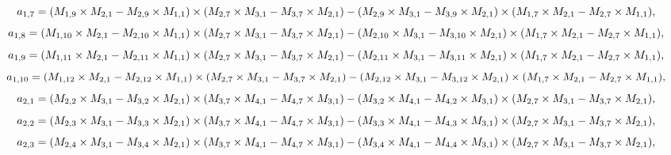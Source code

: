 \documentclass[10pt]{asme2ej}
\begin{document}
\begin{landscape}
\begin{equation}
\end{equation}
\begin{equation}
    a_{1,7} = (M_{1,9}\times M_{2,1}-M_{2,9}\times M_{1,1})\times (M_{2,7}\times M_{3,1}-M_{3,7}\times M_{2,1})\\-(M_{2,9}\times M_{3,1}-M_{3,9}\times M_{2,1})\times (M_{1,7}\times M_{2,1}-M_{2,7}\times M_{1,1}), 
\end{equation}
\begin{equation}
    a_{1,8} = (M_{1,10}\times M_{2,1}-M_{2,10}\times M_{1,1})\times (M_{2,7}\times M_{3,1}-M_{3,7}\times M_{2,1})\\-(M_{2,10}\times M_{3,1}-M_{3,10}\times M_{2,1})\times (M_{1,7}\times M_{2,1}-M_{2,7}\times M_{1,1}), 
\end{equation}
\begin{equation}
    a_{1,9} = (M_{1,11}\times M_{2,1}-M_{2,11}\times M_{1,1})\times (M_{2,7}\times M_{3,1}-M_{3,7}\times M_{2,1})\\-(M_{2,11}\times M_{3,1}-M_{3,11}\times M_{2,1})\times (M_{1,7}\times M_{2,1}-M_{2,7}\times M_{1,1}), 
\end{equation}
\begin{equation}
    a_{1,10} = (M_{1,12}\times M_{2,1}-M_{2,12}\times M_{1,1})\times (M_{2,7}\times M_{3,1}-M_{3,7}\times M_{2,1})\\-(M_{2,12}\times M_{3,1}-M_{3,12}\times M_{2,1})\times (M_{1,7}\times M_{2,1}-M_{2,7}\times M_{1,1}), 
\end{equation}
\begin{equation}
    a_{2,1} = (M_{2,2}\times M_{3,1}-M_{3,2}\times M_{2,1})\times (M_{3,7}\times M_{4,1}-M_{4,7}\times M_{3,1})\\-(M_{3,2}\times M_{4,1}-M_{4,2}\times M_{3,1})\times (M_{2,7}\times M_{3,1}-M_{3,7}\times M_{2,1}),
\end{equation}
\begin{equation}
    a_{2,2} = (M_{2,3}\times M_{3,1}-M_{3,3}\times M_{2,1})\times (M_{3,7}\times M_{4,1}-M_{4,7}\times M_{3,1})\\-(M_{3,3}\times M_{4,1}-M_{4,3}\times M_{3,1})\times (M_{2,7}\times M_{3,1}-M_{3,7}\times M_{2,1}),
\end{equation}
\begin{equation}
    a_{2,3} = (M_{2,4}\times M_{3,1}-M_{3,4}\times M_{2,1})\times (M_{3,7}\times M_{4,1}-M_{4,7}\times M_{3,1})\\-(M_{3,4}\times M_{4,1}-M_{4,4}\times M_{3,1})\times (M_{2,7}\times M_{3,1}-M_{3,7}\times M_{2,1}),
\end{equation}

\end{landscape}
\end{document}
